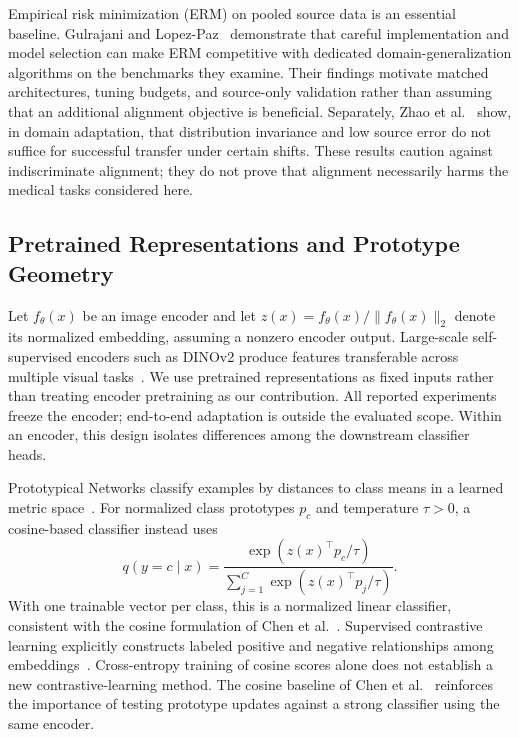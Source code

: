 Empirical risk minimization (ERM) on pooled source data is an essential baseline. Gulrajani and Lopez-Paz~\cite{gulrajani2021domainbed} demonstrate that careful implementation and model selection can make ERM competitive with dedicated domain-generalization algorithms on the benchmarks they examine. Their findings motivate matched architectures, tuning budgets, and source-only validation rather than assuming that an additional alignment objective is beneficial. Separately, Zhao et al.~\cite{zhao2019invariant} show, in domain adaptation, that distribution invariance and low source error do not suffice for successful transfer under certain shifts. These results caution against indiscriminate alignment; they do not prove that alignment necessarily harms the medical tasks considered here.

\subsection{Pretrained Representations and Prototype Geometry}
Let $f_\theta(x)$ be an image encoder and let $z(x)=f_\theta(x)/\|f_\theta(x)\|_2$ denote its normalized embedding, assuming a nonzero encoder output. Large-scale self-supervised encoders such as DINOv2 produce features transferable across multiple visual tasks~\cite{oquab2024dinov2}. We use pretrained representations as fixed inputs rather than treating encoder pretraining as our contribution. All reported experiments freeze the encoder; end-to-end adaptation is outside the evaluated scope. Within an encoder, this design isolates differences among the downstream classifier heads.

Prototypical Networks classify examples by distances to class means in a learned metric space~\cite{snell2017prototypical}. For normalized class prototypes $p_c$ and temperature $\tau>0$, a cosine-based classifier instead uses
\begin{equation}
    q(y=c\mid x)=\frac{\exp(z(x)^\top p_c/\tau)}
    {\sum_{j=1}^{C}\exp(z(x)^\top p_j/\tau)}.
    \label{eq:prototype_classifier}
\end{equation}
With one trainable vector per class, this is a normalized linear classifier, consistent with the cosine formulation of Chen et al.~\cite{chen2019closer}. Supervised contrastive learning explicitly constructs labeled positive and negative relationships among embeddings~\cite{khosla2020supcon}. Cross-entropy training of cosine scores alone does not establish a new contrastive-learning method. The cosine baseline of Chen et al.~\cite{chen2019closer} reinforces the importance of testing prototype updates against a strong classifier using the same encoder.

